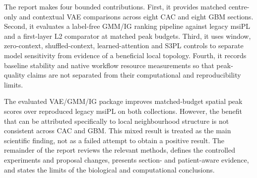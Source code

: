 The report makes four bounded contributions. First, it provides matched
centre-only and contextual VAE comparisons across eight CAC and eight GBM
sections. Second, it evaluates a label-free GMM/IG ranking pipeline against
legacy msiPL and a first-layer L2 comparator at matched peak budgets. Third, it
uses window, zero-context, shuffled-context, learned-attention and S3PL controls
to separate model sensitivity from evidence of a beneficial local topology.
Fourth, it records baseline stability and native workflow resource measurements
so that peak-quality claims are not separated from their computational and
reproducibility limits.

The evaluated VAE/GMM/IG package improves matched-budget spatial peak scores
over reproduced legacy msiPL on both collections. However, the benefit that can
be attributed specifically to local neighbourhood structure is not consistent
across CAC and GBM. This mixed result is treated as the main scientific finding,
not as a failed attempt to obtain a positive result. The remainder of the report
reviews the relevant methods, defines the controlled experiments and proposal
changes, presents section- and patient-aware evidence, and states the limits of
the biological and computational conclusions.

